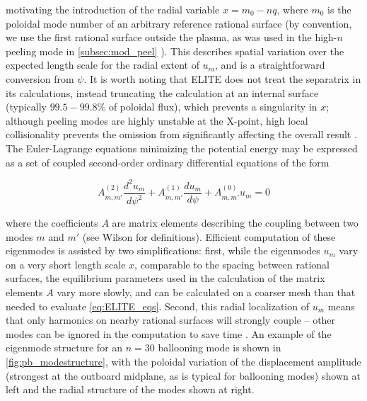 \noindent motivating the introduction of the radial variable $x = m_0 - nq$, where $m_0$ is the poloidal mode number of an arbitrary reference rational surface (by convention, we use the first rational surface outside the plasma, as was used in the high-$n$ peeling mode in \cref{subsec:mod_peel} \cite{Wilson2002}).  This describes spatial variation over the expected length scale for the radial extent of $u_m$, and is a straightforward conversion from $\psi$.  It is worth noting that ELITE does not treat the separatrix in its calculations, instead truncating the calculation at an internal surface (typically $99.5-99.8\%$ of poloidal flux), which prevents a singularity in $x$; although peeling modes are highly unstable at the X-point, high local collisionality prevents the omission from significantly affecting the overall result \cite{Snyder2009a}.  The Euler-Lagrange equations minimizing the potential energy may be expressed as a set of coupled second-order ordinary differential equations of the form \cite{Dowsett2014}

\begin{equation}\label{eq:ELITE_eqs}
 A^{(2)}_{m,m'} \frac{d^2 u_m}{d\psi^2} + A^{(1)}_{m,m'} \frac{du_m}{d\psi} + A^{(0)}_{m,m'} u_m = 0
\end{equation}

\noindent where the coefficients $A$ are matrix elements describing the coupling between two modes $m$ and $m'$ (see Wilson \etal \cite{Wilson2002} for definitions).  Efficient computation of these eigenmodes is assisted by two simplifications: first, while the eigenmodes $u_m$ vary on a very short length scale $x$, comparable to the spacing between rational surfaces, the equilibrium parameters used in the calculation of the matrix elements $A$ vary more slowly, and can be calculated on a coarser mesh than that needed to evaluate \cref{eq:ELITE_eqs}.  Second, this radial localization of $u_m$ means that only harmonics on nearby rational surfaces will strongly couple -- other modes can be ignored in the computation to save time \cite{Wilson2002}.  An example of the eigenmode structure for an $n=30$ ballooning mode is shown in \cref{fig:pb_modestructure}, with the poloidal variation of the displacement amplitude (strongest at the outboard midplane, as is typical for ballooning modes) shown at left and the radial structure of the modes shown at right.


